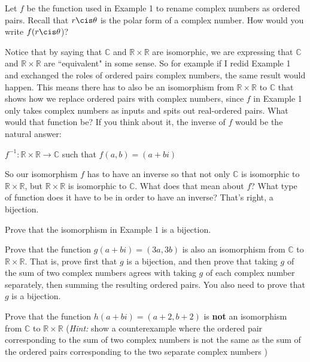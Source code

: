 \begin{exercise}\label{exercise:isomorph:iso_1}
Let $f$ be  the function used in Example 1 to rename complex numbers as ordered pairs. Recall that $r \cis \theta$ is the polar form of a complex number. How would you write $f(r \cis \theta$)?
\end{exercise}

Notice that by saying that ${\mathbb C}$ and ${\mathbb R} \times {\mathbb R}$ are isomorphic, we are expressing that  ${\mathbb C}$ and ${\mathbb R} \times {\mathbb R}$ are ``equivalent" in some sense.  So for example if I redid Example 1 and exchanged the roles of ordered pairs complex numbers, the same result would happen.  This means there has to also be an isomorphism from ${\mathbb R} \times {\mathbb R}$ to ${\mathbb C}$  that shows how we replace ordered pairs with complex numbers, since $f$ in Example 1 only takes complex numbers as inputs and spits out real-ordered pairs.  What would that function be?  If you think about it, the inverse of $f$ would be the natural answer:

\begin{center}
$f^{-1} : {\mathbb R} \times {\mathbb R} \longrightarrow {\mathbb C}$ such that $f(a,b) = (a + bi)$
\end{center}

So our isomorphism $f$ has to have an inverse so that not only ${\mathbb C}$ is isomorphic to ${\mathbb R} \times {\mathbb R}$, but ${\mathbb R} \times {\mathbb R}$ is isomorphic to ${\mathbb C}$.  What does that mean about $f$?  What type of function does it have to be in order to have an inverse?  That's right, a bijection.

\begin{exercise}\label{exercise:isomorph:iso_2}
Prove that the isomorphism in Example 1 is a bijection.
\end{exercise}

\begin{exercise}\label{exercise:isomorph:iso_3} 
Prove that the function $g(a + bi) = (3a, 3b)$ is also an isomorphism from ${\mathbb C}$ to  ${\mathbb R} \times {\mathbb R}$.  That is, prove first that $g$ is a bijection, and then prove that taking $g$ of the sum of two complex numbers agrees with taking $g$ of each complex number separately, then summing the resulting ordered pairs.  You also need to prove that $g$ is a bijection. 
\end{exercise} 

\begin{exercise}\label{exercise:isomorph:iso_4}
Prove that the function $h(a + bi) = (a+2, b+2)$ is {\bf not} an isomorphism from ${\mathbb C}$ to  ${\mathbb R} \times {\mathbb R}$ ({\it Hint:} show a counterexample where the ordered pair corresponding to the sum of two complex numbers is not the same as the sum of the ordered pairs corresponding to the two separate complex numbers )
\end{exercise}


